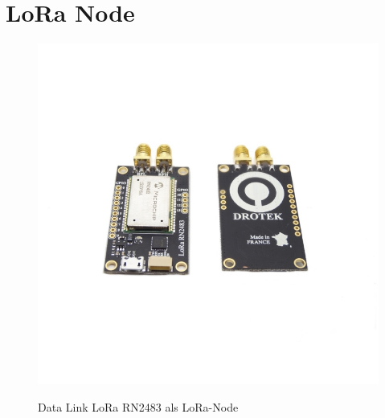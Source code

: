\section{LoRa Node}
\begin{figure}[ht]
    \center
    \includegraphics[width=15cm]{Bilder/lora-node.jpg}\\
    \caption{Data Link LoRa RN2483 als LoRa-Node}
    \label{fig:Lora-Node}
\end{figure}

